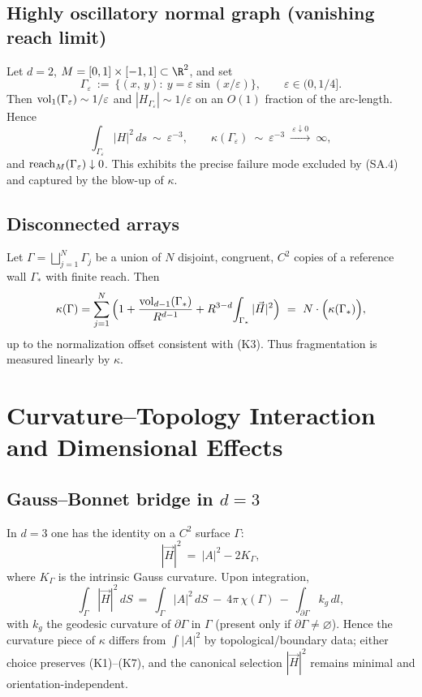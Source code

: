 \subsection{Highly oscillatory normal graph (vanishing reach limit)}
\label{subsec:oscillatory}
Let $d=2$, $M=[0,1]\times[-1,1]\subset\R^2$, and set
\[
\Gamma_\varepsilon\ :=\ \{(x,\,y):\ y=\varepsilon \sin(x/\varepsilon)\},\qquad \varepsilon\in(0,1/4].
\]
Then $\operatorname{vol}_1(\Gamma_\varepsilon)\sim 1/\varepsilon$ and $|H_{\Gamma_\varepsilon}|\sim 1/\varepsilon$ on an $O(1)$ fraction of the arc-length.
Hence
\[
\int_{\Gamma_\varepsilon} |H|^2\,ds\ \sim\ \varepsilon^{-3},\qquad
\kappa(\Gamma_\varepsilon)\ \sim\ \varepsilon^{-3}\ \xrightarrow{\ \varepsilon\downarrow 0\ }\ \infty,
\]
and $\operatorname{reach}_M(\Gamma_\varepsilon)\downarrow 0$.
This exhibits the precise failure mode excluded by (SA.4) and captured by the blow-up of $\kappa$.

\subsection{Disconnected arrays}
\label{subsec:disconnected}
Let $\Gamma=\bigsqcup_{j=1}^{N}\Gamma_j$ be a union of $N$ disjoint, congruent, $C^2$ copies of a reference wall $\Gamma_*$ with finite reach. Then
\[
\kappa(\Gamma)=\sum_{j=1}^N \Big(1+\frac{\operatorname{vol}_{d-1}(\Gamma_*)}{R^{d-1}}+R^{3-d}\!\int_{\Gamma_*} |\vec H|^2\Big)
\ =\ N\cdot \Big(\kappa(\Gamma_*)\Big),
\]
up to the normalization offset consistent with (K3).
Thus fragmentation is measured linearly by $\kappa$.

\section{Curvature--Topology Interaction and Dimensional Effects}
\label{sec:curvature-topology}

\subsection{Gauss--Bonnet bridge in $d=3$}
In $d=3$ one has the identity on a $C^2$ surface $\Gamma$:
\[
|\vec H|^2\ =\ |A|^2-2K_\Gamma,
\]
where $K_\Gamma$ is the intrinsic Gauss curvature. Upon integration,
\[
\int_\Gamma |\vec H|^2\,dS\ =\ \int_\Gamma |A|^2\,dS\ -\ 4\pi\,\chi(\Gamma)\ -\ \int_{\partial\Gamma} k_g\,dl,
\]
with $k_g$ the geodesic curvature of $\partial\Gamma$ in $\Gamma$ (present only if $\partial\Gamma\neq\varnothing$).
Hence the curvature piece of $\kappa$ differs from $\int |A|^2$ by topological/boundary data; either choice preserves
(K1)–(K7), and the canonical selection $|\vec H|^2$ remains minimal and orientation-independent.

